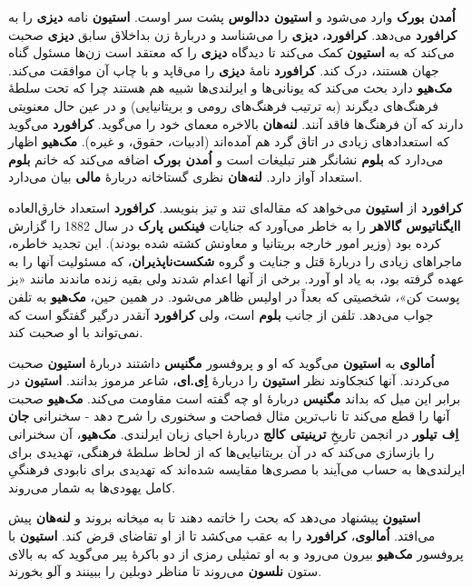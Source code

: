 \documentclass[12pt]{book}
\newcommand{\noun}[1]{{\textbf{#1}}}
\begin{document}
    \noun{اُمدن بورک} وارد می‌شود و \noun{استیون ددالوس} پشت سر اوست. \noun{استیون} نامه \noun{دیزی} را به \noun{کرافورد} می‌دهد. \noun{کرافورد}، \noun{دیزی} را می‌شناسد و دربارهٔ زن بداخلاق سابق \noun{دیزی} صحبت می‌کند که به \noun{استیون} کمک می‌کند تا دیدگاه \noun{دیزی} را که معتقد است زن‌ها مسئول گناه جهان هستند، درک کند. \noun{کرافورد} نامهٔ \noun{دیزی} را می‌قاپد و با چاپ آن موافقت می‌کند. \noun{مک‌هیو} دارد بحث می‌کند که یونانی‌ها و ایرلندی‌ها شبیه هم هستند چرا که تحت سلطهٔ فرهنگ‌های دیگرند (به ترتیب فرهنگ‌های رومی و بریتانیایی) و در عین حال معنویتی دارند که آن فرهنگ‌ها فاقد آنند. \noun{لنه‌هان} بالاخره معمای خود را می‌گوید. \noun{کرافورد} می‌گوید که استعدادهای زیادی در اتاق گرد هم آمده‌اند (ادبیات، حقوق، و غیره). \noun{مک‌هیو} اظهار می‌دارد که \noun{بلوم} نشانگر هنر تبلیغات است و \noun{اُمدن بورک} اضافه می‌کند که خانم \noun{بلوم} استعداد آواز دارد. \noun{لنه‌هان} نظری گستاخانه دربارهٔ \noun{مالی} بیان می‌دارد.

    \noun{کرافورد} از \noun{استیون} می‌خواهد که مقاله‌ای تند و تیز بنویسد. \noun{کرافورد} استعداد خارق‌العاده \noun{اایگناتیوس گالاهر} را به خاطر می‌آورد که جنایات \noun{فینکس پارک} در سال 1882 را گزارش کرده بود (وزیر امور خارجه بریتانیا و معاونش کشته شده بودند). این تجدید خاطره، ماجراهای زیادی را دربارهٔ قتل و جنایت و گروه \noun{شکست‌ناپذیران}، که مسئولیت آنها را به عهده گرفته بود، به یاد او آورد. برخی از آنها اعدام شدند ولی بقیه زنده ماندند مانند «بز پوست کن»، شخصیتی که بعداً در اولیس ظاهر می‌شود. در همین حین، \noun{مک‌هیو} به تلفن جواب می‌دهد. تلفن از جانب \noun{بلوم} است، ولی \noun{کرافورد} آنقدر درگیر گفتگو است که نمی‌تواند با او صحبت کند.

    \noun{اُمالوی} به \noun{استیون} می‌گوید که او و پروفسور \noun{مگنیس} داشتند دربارهٔ \noun{استیون} صحبت می‌کردند. آنها کنجکاوند نظر \noun{استیون} را دربارهٔ \noun{اِی.ای}، شاعر مرموز بدانند. \noun{استیون} در برابر این میل که بداند \noun{مگنیس} دربارهٔ او چه گفته است مقاومت می‌کند. \noun{مک‌هیو} صحبت آنها را قطع می‌کند تا ناب‌ترین مثال فصاحت و سخنوری را شرح دهد - سخنرانی \noun{جان اِف تیلور} در انجمن تاریخِ \noun{ترینیتی کالج}  دربارهٔ احیای زبان ایرلندی. \noun{مک‌هیو}، آن سخنرانی را بازسازی می‌کند که در آن بریتانیایی‌ها که از لحاظ سلطهٔ فرهنگی، تهدیدی برای ایرلندی‌ها به حساب می‌آیند با مصری‌ها مقایسه شده‌اند که تهدیدی برای نابودی فرهنگیِ کامل یهودی‌ها به شمار می‌روند.

    \noun{استیون} پیشنهاد می‌دهد که بحث را خاتمه دهند تا به میخانه بروند و \noun{لنه‌هان} پیش می‌افتد. \noun{اُمالوی}، \noun{کرافورد} را به عقب می‌کشد تا از او تقاضای قرض کند. \noun{استیون} با پروفسور \noun{مک‌هیو} بیرون می‌رود و به او تمثیلی رمزی از دو باکرهٔ پیر می‌گوید که به بالای ستون \noun{نلسون} می‌روند تا مناظر دوبلین را ببینند و آلو بخورند.
\end{document}
